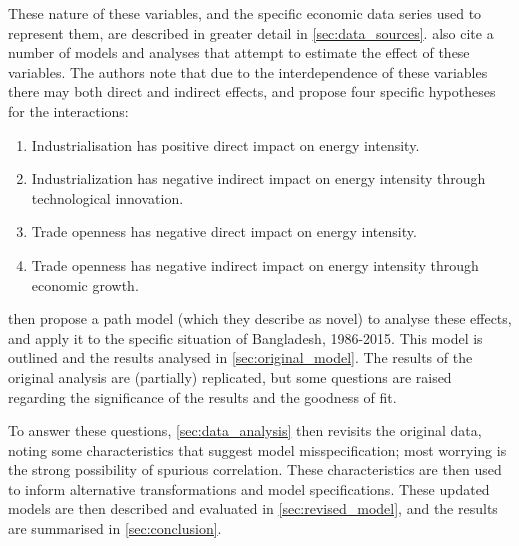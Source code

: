 \documentclass[11pt,a4paper]{article}
\begin{document}
These nature of these variables, and the specific economic data series used to represent them, are described in greater detail in \cref{sec:data_sources}.
\cite{panHowIndustrializationTrade2019} also cite a number of models and analyses that attempt to estimate the effect of these variables. 
The authors note that due to the interdependence of these variables there may both direct and indirect effects, and propose four specific hypotheses for the interactions:
\begin{enumerate}[label=\textbf{H.\arabic*}]
\item Industrialisation has positive direct impact on energy intensity.
\item Industrialization has negative indirect impact on energy intensity through technological innovation.
\item Trade openness has negative direct impact on energy intensity.
\item Trade openness has negative indirect impact on energy intensity through economic growth.
\end{enumerate}

\cite{panHowIndustrializationTrade2019} then propose a path model (which they describe as novel) to analyse these effects, and apply it to the specific situation of Bangladesh, 1986-2015.
This model is outlined and the results analysed in \cref{sec:original_model}.
The results of the original analysis are (partially) replicated, but some questions are raised regarding the significance of the results and the goodness of fit.

To answer these questions, \cref{sec:data_analysis} then revisits the original data, noting some characteristics that suggest model misspecification; most worrying is the strong possibility of spurious correlation.
These characteristics are then used to inform alternative transformations and model specifications.
These updated models are then described and evaluated in \cref{sec:revised_model}, and the results are summarised in \cref{sec:conclusion}.

\clearpage
\end{document}

